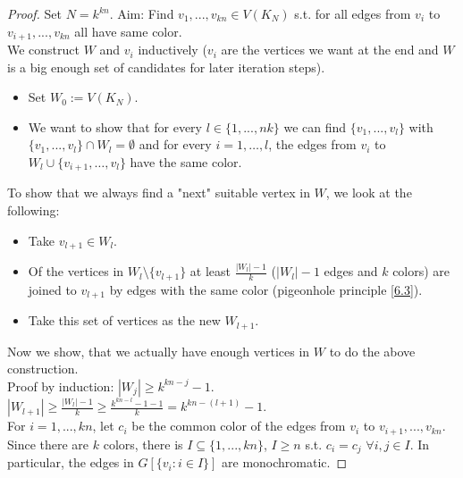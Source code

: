\begin{proof}
    Set $N=k^{kn}$. Aim: Find $v_1,...,v_{kn}\in V(K_N)$ s.t. for all edges from $v_i$ to $v_{i+1},...,v_{kn}$ all have same color.\\
    We construct $W$ and $v_i$ inductively ($v_i$ are the vertices we want at the end and $W$ is a big enough set of candidates for later iteration steps).\\
    \begin{itemize}
        \item Set $W_0:=V(K_N)$.
        \item We want to show that for every $l\in \{1,...,nk\}$ we can find $\{v_1,...,v_l\}$ with $\{v_1,...,v_l\}\cap W_l=\emptyset$ and for every $i = 1, \dots, l$, the edges from $v_i$ to $W_l \cup \{v_{i+1}, \dots, v_l\}$ have the same color.
    \end{itemize}
    To show that we always find a "next" suitable vertex in $W$, we look at the following:
    \begin{itemize}
        \item Take $v_{l+1}\in W_l$.
        \item Of the vertices in $W_l\setminus\{v_{l+1}\}$ at least $\frac{|W_l|-1}{k}$ ($|W_l|-1$ edges and $k$ colors) are joined to $v_{l+1}$ by edges with the same color (pigeonhole principle \ref{6.3}).
        \item Take this set of vertices as the new $W_{l+1}$.
    \end{itemize}
    Now we show, that we actually have enough vertices in $W$ to do the above construction.\\
    Proof by induction: $|W_j|\geq k^{kn-j}-1$.\\
    $|W_{l+1}|\geq \frac{|W_l|-1}{k}\geq \frac{k^{kn-l}-1-1}{k}=k^{kn-(l+1)}-1$.\\
    For $i=1,...,kn$, let $c_i$ be the common color of the edges from $v_i$ to $v_{i+1},...,v_{kn}$. Since there are $k$ colors, there is $I\subseteq \{1,...,kn\}$, $I\geq n$ s.t. $c_i=c_j$ $\forall i,j\in I$. In particular, the edges in $G[\{v_i:i\in I\}]$ are monochromatic.
\end{proof}        
